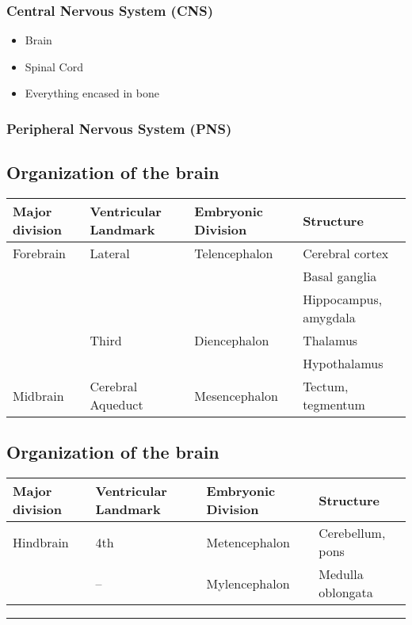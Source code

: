 \documentclass[]{article}
\providecommand{\tightlist}{%
  \setlength{\itemsep}{0pt}\setlength{\parskip}{0pt}}
\begin{document}
\subsubsection{Central Nervous System
(CNS)}\label{central-nervous-system-cns}

\begin{itemize}
\tightlist
\item
  Brain
\item
  Spinal Cord
\item
  Everything encased in bone
\end{itemize}

\subsubsection{Peripheral Nervous System
(PNS)}\label{peripheral-nervous-system-pns}

\subsection{Organization of the brain}\label{organization-of-the-brain}

\begin{longtable}[]{@{}llll@{}}
\toprule
Major division & Ventricular Landmark & Embryonic Division &
Structure\tabularnewline
\midrule
\endhead
Forebrain & Lateral & Telencephalon & Cerebral cortex\tabularnewline
& & & Basal ganglia\tabularnewline
& & & Hippocampus, amygdala\tabularnewline
& Third & Diencephalon & Thalamus\tabularnewline
& & & Hypothalamus\tabularnewline
Midbrain & Cerebral Aqueduct & Mesencephalon & Tectum,
tegmentum\tabularnewline
\bottomrule
\end{longtable}

\subsection{Organization of the
brain}\label{organization-of-the-brain-1}

\begin{longtable}[]{@{}llll@{}}
\toprule
Major division & Ventricular Landmark & Embryonic Division &
Structure\tabularnewline
\midrule
\endhead
Hindbrain & 4th & Metencephalon & Cerebellum, pons\tabularnewline
& -- & Mylencephalon & Medulla oblongata\tabularnewline
\bottomrule
\end{longtable}

\begin{center}\rule{0.5\linewidth}{\linethickness}\end{center}
\end{document}
